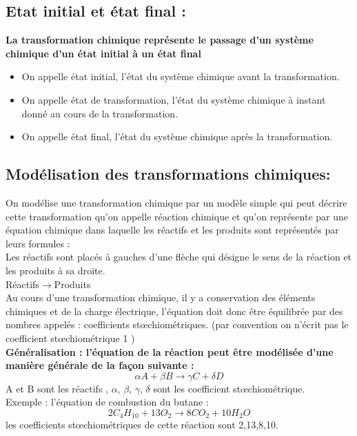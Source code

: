 \documentclass[12pt]{article}
\begin{document}
\subsection{ Etat initial et état final :}
    \textbf{La transformation chimique représente le passage d’un système chimique d’un état initial à un état final}
\begin{itemize}
    \item On appelle état initial, l’état du système chimique avant la transformation.
    \item On appelle état de transformation, l’état du système chimique à instant donné au cours de la transformation.
    \item  On appelle état final, l’état du système chimique après la transformation.
\end{itemize}

\subsection{ Modélisation des transformations chimiques:}
On modélise une transformation chimique par un modèle simple qui peut décrire cette transformation qu'on appelle réaction
chimique et qu'on représente par une équation chimique dans laquelle les réactifs et les produits sont représentés par leurs
formules :\\
Les réactifs sont placés à gauches d'une flèche qui désigne le sens de la réaction et les produits à sa droite. \\ 
 Réactifs$ \rightarrow $Produits \\
Au cours d’une transformation chimique, il y a conservation des éléments chimiques et de la charge électrique, l’équation doit
donc être équilibrée par des nombres appelés : coefficients stœchiométriques.
(par convention on n’écrit pas le coefficient stœchiométrique 1 )\\

\textbf{Généralisation : l'équation de la réaction peut être modélisée d'une manière générale de la façon suivante : }\\
$$\alpha A + \beta B \rightarrow \gamma C + \delta D$$
A et B sont les réactifs , $\alpha $, $\beta $, $\gamma $, $\delta $ sont les coefficient stœchiométrique.\\
Exemple : l'équation de combustion du butane : $${2C_4H_10 + 13O_2 \rightarrow 8CO_2 + 10H_2O}$$
les coefficients stœchiométriques de cette réaction sont 2,13,8,10.
\end{document}

